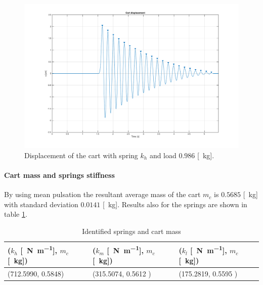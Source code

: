 \begin{figure}[!h]
    \centering
    \includegraphics[width=1\textwidth]{img/cart_detached_1.png}
    \caption{Displacement of the cart with spring $k_h$ and load $0.986$ [\SI{}{\kilo \gram}].}
    \label{fig:cart_detached_figure}
\end{figure}
\paragraph{Cart mass and springs stiffness}
By using   mean pulsation the resultant average mass of the cart $m_c$ is $0.5685$ [\SI{}{\kilo\gram}] with standard deviation $  0.0141$ [\SI{}{\kilo \gram}]. Results also for the springs are shown in table \ref{table: cart_springs_mass}.
\begin{table}[!h]
\centering
\label{table: cart_springs_mass}
\begin{tabular}{|l|l|l|}
\hline
{\textbf{($k_h$ [\SI{}{\newton \per \metre}], $m_c$ [\SI{}{\kilo \gram}])}} & \textbf{($k_m$ [\SI{}{\newton \per \metre}], $m_c$ [\SI{}{\kilo \gram}])} & \textbf{($k_l$ [\SI{}{\newton \per \metre}], $m_c$ [\SI{}{\kilo \gram}])} \\ \hline
(712.5990, 0.5848)              & (315.5074, 0.5612 )     & (175.2819, 0.5595 )     \\ \hline
\end{tabular}
\caption{Identified springs and cart mass}
\end{table}

